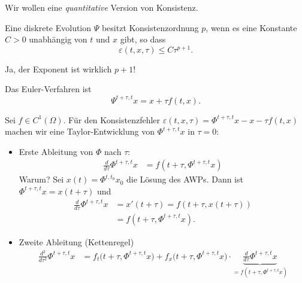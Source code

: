 Wir wollen eine \textit{quantitative} Version von Konsistenz.

\begin{defi}
	Eine diskrete Evolution $\Psi$ besitzt Konsistenzordnung $p$, wenn es eine Konstante $C>0$ unabhängig von $t$ und $x$ gibt, so dass
	\begin{equation*}
	 \varepsilon (t,x,\tau) \leq C \tau^{p+1}.
	\end{equation*}
\end{defi}

\begin{hinw}
	Ja, der Exponent ist wirklich $p+1$!
\end{hinw}

\begin{bsp}
Das Euler-Verfahren ist
\begin{equation*}
	 \Psi^{t+\tau,t} x=x+\tau f(t,x).
\end{equation*}

Sei $f \in C^1 (\Omega )$. Für den Konsistenzfehler $\varepsilon (t,x,\tau)=\Phi^{t+\tau,t} x-x-\tau f(t,x)$ machen wir eine Taylor-Entwicklung von $\Phi^{t+\tau,t} x$ in $\tau=0$:
	\begin{itemize}
		\item Erste Ableitung von $\Phi$ nach $\tau$:
		\begin{align*}
		\frac{d}{d \tau} \Phi^{t+\tau,t} x & =f (t+\tau,\Phi^{t+\tau,t} x )
		\end{align*}
		Warum? Sei $x(t) = \Phi^{t,t_0} x_0$ die Lösung des AWPs. 
		Dann ist $\Phi^{t+\tau,t}x = x(t+\tau)$ und
		\begin{align*}
			\frac{d}{d \tau} \Phi^{t+\tau,t} x & = x'(t+\tau) = f(t+\tau,x(t+\tau)) \\
			& = f (t+\tau,\Phi^{t+\tau,t} x ).
		\end{align*}
		\item Zweite Ableitung (Kettenregel)
		\begin{align*}
			\frac{d^2}{d \tau^2} \Phi^{t+\tau,t} x
			& =
			f_t \big(t+\tau,\Phi^{t+\tau,t} x \big)+f_x \big(t+\tau,\Phi^{t+\tau,t} x \big)
			\cdot \underbrace{\frac{d}{d \tau} \Phi^{t+\tau,t} x}_{=f (t+\tau,\Phi^{t+\tau,t}x)}
		\end{align*}
		

\end{itemize}
\end{bsp}
